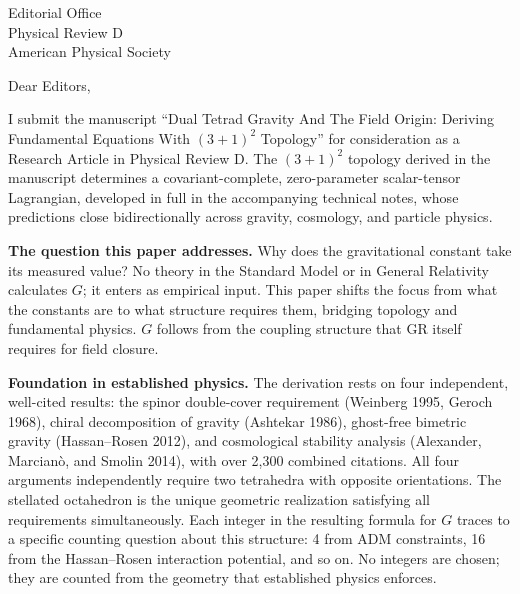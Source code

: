 \documentclass[11pt]{letter}
\begin{document}
\begin{letter}{Editorial Office\\Physical Review D\\American Physical Society}

\opening{Dear Editors,}

I submit the manuscript ``Dual Tetrad Gravity And The Field Origin: Deriving Fundamental Equations With $(3{+}1)^2$ Topology'' for consideration as a Research Article in Physical Review D.
The $(3{+}1)^2$ topology derived in the manuscript determines a covariant-complete, zero-parameter scalar-tensor Lagrangian, developed in full in the accompanying technical notes, whose predictions close bidirectionally across gravity, cosmology, and particle physics.


\textbf{The question this paper addresses.}\quad
Why does the gravitational constant take its measured value?
No theory in the Standard Model or in General Relativity calculates $G$; it enters as empirical input.
This paper shifts the focus from what the constants are to what structure requires them, bridging topology and fundamental physics.
$G$ follows from the coupling structure that GR itself requires for field closure.


\textbf{Foundation in established physics.}\quad
The derivation rests on four independent, well-cited results: the spinor double-cover requirement (Weinberg 1995, Geroch 1968), chiral decomposition of gravity (Ashtekar 1986), ghost-free bimetric gravity (Hassan--Rosen 2012), and cosmological stability analysis (Alexander, Marcian\`{o}, and Smolin 2014), with over 2,300 combined citations.
All four arguments independently require two tetrahedra with opposite orientations.
The stellated octahedron is the unique geometric realization satisfying all requirements simultaneously.
Each integer in the resulting formula for $G$ traces to a specific counting question about this structure: 4 from ADM constraints, 16 from the Hassan--Rosen interaction potential, and so on.
No integers are chosen; they are counted from the geometry that established physics enforces.


\end{letter}
\end{document}

